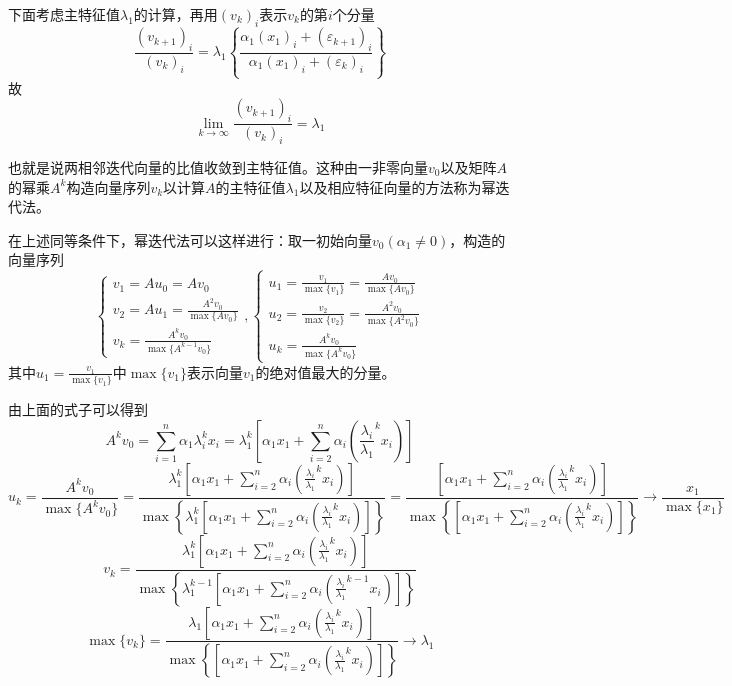 \documentclass[UTF8]{ctexart}
\begin{document}
    下面考虑主特征值$\lambda_1$的计算，再用$(v_k)_i$表示$v_k$的第$i$个分量
    \[\frac{(v_{k+1})_i}{(v_k)_i}=\lambda_1\left\{\frac{\alpha_1(x_1)_i+(\varepsilon_{k+1})_i}{\alpha_1(x_1)_i+(\varepsilon_{k})_i}\right\}\]
    故\[\lim\limits_{k\to\infty}\frac{(v_{k+1})_i}{(v_k)_i}=\lambda_1\]

    也就是说两相邻迭代向量的比值收敛到主特征值。这种由一非零向量$v_0$以及矩阵$A$的幂乘$A^k$构造向量序列$v_k$以计算$A$的主特征值$\lambda_1$以及相应特征向量的方法称为幂迭代法。

    在上述同等条件下，幂迭代法可以这样进行：取一初始向量$v_0(\alpha_1\neq0)$，构造的向量序列
    \[
    \begin{cases}
        v_1=Au_0=Av_0\\\displaystyle v_2=Au_1=\frac{A^2v_0}{\max\{Av_0\}}\\\displaystyle v_k=\frac{A^k v_0}{\max\{A^{k-1}v_0\}}
    \end{cases},\begin{cases}
        \displaystyle u_1=\frac{v_1}{\max\{v_1\}}=\frac{Av_0}{\max\{Av_0\}}\\\displaystyle u_2=\frac{v_2}{\max\{v_2\}}=\frac{A^2v_0}{\max\{A^2v_0\}}\\\displaystyle u_k=\frac{A^kv_0}{\max\{A^kv_0\}}
    \end{cases}
    \]
    其中$\displaystyle u_1=\frac{v_1}{\max\{v_1\}}$中$\max\{v_1\}$表示向量$v_1$的绝对值最大的分量。

    由上面的式子可以得到\[A^kv_0=\sum\limits_{i=1}^n \alpha_1\lambda_i^kx_i=\lambda_1^k\left[\alpha_1x_1+\sum\limits_{i=2}^n \alpha_i\left(\frac{\lambda_i}{\lambda_1}^kx_i\right)\right]\]
    \[u_k=\frac{A^kv_0}{\max\{A^kv_0\}}=\frac{\lambda_1^k\left[\alpha_1x_1+\sum\limits_{i=2}^n \alpha_i\left(\frac{\lambda_i}{\lambda_1}^kx_i\right)\right]}{\max\left\{\lambda_1^k\left[\alpha_1x_1+\sum\limits_{i=2}^n \alpha_i\left(\frac{\lambda_i}{\lambda_1}^kx_i\right)\right]\right\}}=\frac{\left[\alpha_1x_1+\sum\limits_{i=2}^n \alpha_i\left(\frac{\lambda_i}{\lambda_1}^kx_i\right)\right]}{\max\left\{\left[\alpha_1x_1+\sum\limits_{i=2}^n \alpha_i\left(\frac{\lambda_i}{\lambda_1}^kx_i\right)\right]\right\}}\to\frac{x_1}{\max\{x_1\}}\]
    \[v_k=\frac{\lambda_1^k\left[\alpha_1x_1+\sum\limits_{i=2}^n \alpha_i\left(\frac{\lambda_i}{\lambda_1}^kx_i\right)\right]}{\max\left\{\lambda_1^{k-1}\left[\alpha_1x_1+\sum\limits_{i=2}^n \alpha_i\left(\frac{\lambda_i}{\lambda_1}^{k-1}x_i\right)\right]\right\}}\]
    \[\max\{v_k\}=\frac{\lambda_1\left[\alpha_1x_1+\sum\limits_{i=2}^n \alpha_i\left(\frac{\lambda_i}{\lambda_1}^kx_i\right)\right]}{\max\left\{\left[\alpha_1x_1+\sum\limits_{i=2}^n \alpha_i\left(\frac{\lambda_i}{\lambda_1}^kx_i\right)\right]\right\}}\to \lambda_1\]
\end{document}
